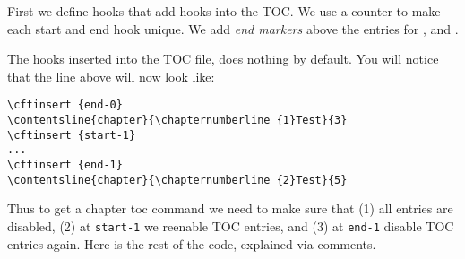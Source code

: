 \begin{sniplet}
 
  First we define hooks that add hooks into the TOC. We use a counter
  to make each start and end hook unique. We add \emph{end markers}
  above the \toc{} entries for ,  and
  .
\begin{lcode}
\renewcommand\mempreaddchaptertotochook{\cftinserthook{toc}{end-\thetocmarker}}
\renewcommand\mempreaddparttotochook   {\cftinserthook{toc}{end-\thetocmarker}}
\renewcommand\mempreaddbooktotochook   {\cftinserthook{toc}{end-\thetocmarker}}
\renewcommand\mempreaddapppagetotochook{\cftinserthook{toc}{end-\thetocmarker}}
\renewcommand\mempostaddchaptertotochook{%
  \stepcounter{tocmarker}\cftinserthook{toc}{start-\thetocmarker}}
\let\normalchangetocdepth\changetocdepth %
\end{lcode}
The hooks inserted into the TOC file, does nothing by default. You
will notice that the line above will now look like:
\begin{verbatim}
\cftinsert {end-0}
\contentsline{chapter}{\chapternumberline {1}Test}{3}
\cftinsert {start-1}
...
\cftinsert {end-1}
\contentsline{chapter}{\chapternumberline {2}Test}{5}
\end{verbatim}
Thus to get a chapter toc command we need to make sure that (1) all
entries are disabled, (2) at \texttt{start-1} we reenable TOC entries,
and (3) at \texttt{end-1} disable TOC entries again. Here is the rest
of the code, explained via comments.
\begin{lcode}
\makeatletter
\newcommand\chaptertoc{
  \begingroup
  \setcounter{@memmarkcntra}{\value{tocdepth}}
  \let\changetocdepth\@gobble
  \normalchangetocdepth{-10}
  \cftinsertcode{start-\thetocmarker}{\normalchangetocdepth{3}}
  \cftinsertcode{end-\thetocmarker}{\normalchangetocdepth{-10}}
  \let\tocheadstart\relax
  \let\printtoctitle\@gobble
  \let\aftertoctitle\relax
  \setlength{\cftsectionindent}{0pt}
}
\end{lcode}
\end{sniplet}
